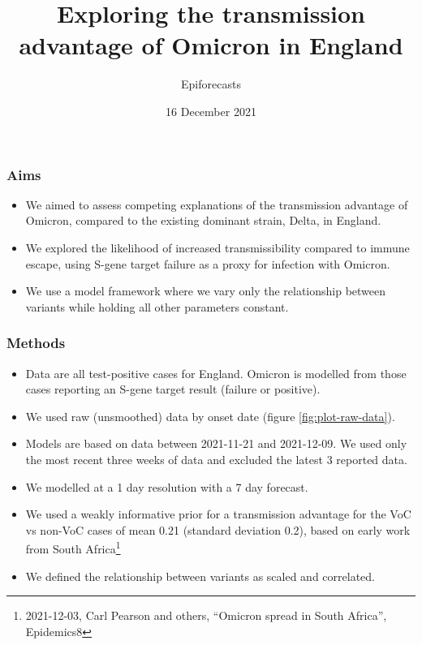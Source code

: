 \documentclass[
]{article}
\title{Exploring the transmission advantage of Omicron in England}
\author{Epiforecasts}
\date{16 December 2021}
\providecommand{\tightlist}{%
  \setlength{\itemsep}{0pt}\setlength{\parskip}{0pt}}
\begin{document}
\maketitle

\hypertarget{aims}{%
\subsubsection*{Aims}\label{aims}}

\begin{itemize}
\tightlist
\item
  We aimed to assess competing explanations of the transmission advantage of Omicron, compared to the existing dominant strain, Delta, in England.
\item
  We explored the likelihood of increased transmissibility compared to immune escape, using S-gene target failure as a proxy for infection with Omicron.
\item
  We use a model framework where we vary only the relationship between variants while holding all other parameters constant.
\end{itemize}

\hypertarget{methods}{%
\subsubsection*{Methods}\label{methods}}

\begin{itemize}
\tightlist
\item
  Data are all test-positive cases for England. Omicron is modelled from those cases reporting an S-gene target result (failure or positive).
\item
  We used raw (unsmoothed) data by onset date (figure \ref{fig:plot-raw-data}).
\item
  Models are based on data between 2021-11-21 and 2021-12-09. We used only the most recent three weeks of data and excluded the latest 3 reported data.
\item
  We modelled at a 1 day resolution with a 7 day forecast.
\item
  We used a weakly informative prior for a transmission advantage for the VoC vs non-VoC cases of mean 0.21 (standard deviation 0.2), based on early work from South Africa\footnote{2021-12-03, Carl Pearson and others, ``Omicron spread in South Africa'', Epidemics8}
\item
  We defined the relationship between variants as scaled and correlated.
\end{itemize}
\end{document}
